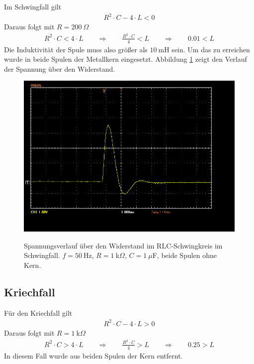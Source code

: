 \documentclass{article}
\begin{document}
Im Schwingfall gilt
\begin{align*}
R^2\cdot C - 4\cdot L < 0
\end{align*}
Daraus folgt mit $R=200~\Omega$
\begin{align*}
R^2\cdot C < 4\cdot L \qquad\Longrightarrow\qquad \frac{R^2\cdot C}{4} < L \qquad\Longrightarrow\qquad 0.01 < L
\end{align*}
Die Induktivität der Spule muss also größer als $10~$mH sein. Um das zu erreichen wurde in beide Spulen der Metallkern eingesetzt. Abbildung \ref{fig:schwing} zeigt den Verlauf der Spannung über den Widerstand.

\begin{figure}[H]
\caption{Spannungsverlauf über den Widerstand im RLC-Schwingkreis im Schwingfall. $f=50~$Hz, $R=1~$k$\Omega$, $C=1~\mu$F, beide Spulen ohne Kern.}
\label{fig:schwing}
{\centering
\includegraphics[scale=0.4]{winkler/schwingfall.png}}
\end{figure}


\subsection{Kriechfall}

Für den Kriechfall gilt
\begin{align*}
R^2\cdot C - 4\cdot L > 0
\end{align*}
Daraus folgt mit $R=1~$k$\Omega$
\begin{align*}
R^2\cdot C > 4\cdot L  \qquad\Longrightarrow\qquad \frac{R^2\cdot C}{4} > L \qquad\Longrightarrow\qquad 0.25 > L
\end{align*}
In diesem Fall wurde aus beiden Spulen der Kern entfernt. 
\end{document}
